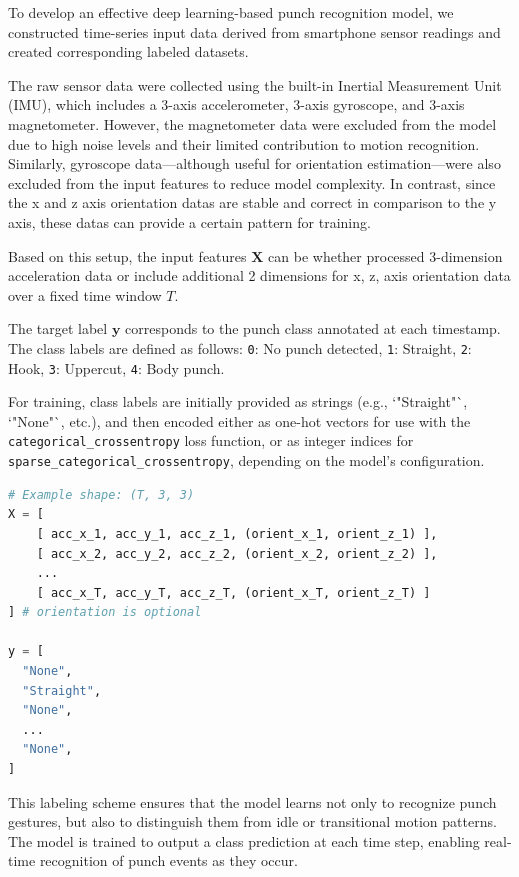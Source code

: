 \documentclass{article}
\begin{document}
To develop an effective deep learning-based punch recognition model, we constructed time-series input data derived from smartphone sensor readings and created corresponding labeled datasets.

The raw sensor data were collected using the built-in Inertial Measurement Unit (IMU), which includes a 3-axis accelerometer, 3-axis gyroscope, and 3-axis magnetometer. However, the magnetometer data were excluded from the model due to high noise levels and their limited contribution to motion recognition. Similarly, gyroscope data—although useful for orientation estimation—were also excluded from the input features to reduce model complexity. In contrast, since the x and z axis orientation datas are stable and correct in comparison to the y axis, these datas can provide a certain pattern for training.

Based on this setup, the input features $\mathbf{X}$ can be whether processed 3-dimension acceleration data or include additional 2 dimensions for x, z, axis orientation data over a fixed time window $T$.

The target label $\mathbf{y}$ corresponds to the punch class annotated at each timestamp. The class labels are defined as follows:  
\texttt{0}: No punch detected,  
\texttt{1}: Straight,  
\texttt{2}: Hook,  
\texttt{3}: Uppercut,  
\texttt{4}: Body punch.

For training, class labels are initially provided as strings (e.g., `"Straight"`, `"None"`, etc.), and then encoded either as one-hot vectors for use with the \texttt{categorical\_crossentropy} loss function, or as integer indices for \texttt{sparse\_categorical\_crossentropy}, depending on the model's configuration.

\begin{lstlisting}[language=Python, caption={Example input-output data format}]
# Example shape: (T, 3, 3)
X = [
    [ acc_x_1, acc_y_1, acc_z_1, (orient_x_1, orient_z_1) ], 
    [ acc_x_2, acc_y_2, acc_z_2, (orient_x_2, orient_z_2) ],
    ...
    [ acc_x_T, acc_y_T, acc_z_T, (orient_x_T, orient_z_T) ]
] # orientation is optional

y = [
  "None",
  "Straight",
  "None",
  ...
  "None",
]
\end{lstlisting}
This labeling scheme ensures that the model learns not only to recognize punch gestures, but also to distinguish them from idle or transitional motion patterns. The model is trained to output a class prediction at each time step, enabling real-time recognition of punch events as they occur.
\end{document}
